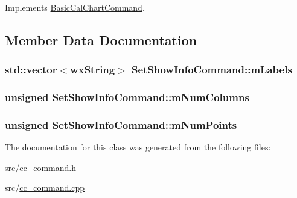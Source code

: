 Implements \hyperlink{a00018_ab6f65965601103020ea8276abf88313a}{Basic\-Cal\-Chart\-Command}.



\subsection{Member Data Documentation}
\hypertarget{a00136_ab4c39c419e60dd039927200bb3d671f3}{
\subsubsection[{m\-Labels}]{\setlength{\rightskip}{0pt plus 5cm}std\-::vector$<$wx\-String$>$ Set\-Show\-Info\-Command\-::m\-Labels\hspace{0.3cm}{\ttfamily [protected]}}}\label{a00136_ab4c39c419e60dd039927200bb3d671f3}
\hypertarget{a00136_a4d62eceaf69d3ec198fde071f5880463}{
\subsubsection[{m\-Num\-Columns}]{\setlength{\rightskip}{0pt plus 5cm}unsigned Set\-Show\-Info\-Command\-::m\-Num\-Columns\hspace{0.3cm}{\ttfamily [protected]}}}\label{a00136_a4d62eceaf69d3ec198fde071f5880463}
\hypertarget{a00136_aef24aa82f671e920fe63eb00c20bab9a}{
\subsubsection[{m\-Num\-Points}]{\setlength{\rightskip}{0pt plus 5cm}unsigned Set\-Show\-Info\-Command\-::m\-Num\-Points\hspace{0.3cm}{\ttfamily [protected]}}}\label{a00136_aef24aa82f671e920fe63eb00c20bab9a}


The documentation for this class was generated from the following files\-:\begin{DoxyCompactItemize}
\item 
src/\hyperlink{a00183}{cc\-\_\-command.\-h}\item 
src/\hyperlink{a00182}{cc\-\_\-command.\-cpp}\end{DoxyCompactItemize}
